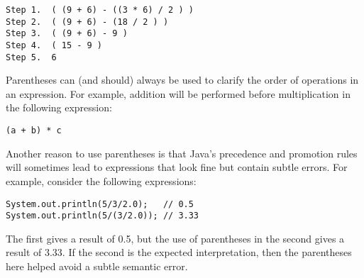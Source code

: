 \begin{jjjlisting}
\begin{lstlisting}
Step 1.  ( (9 + 6) - ((3 * 6) / 2 ) )
Step 2.  ( (9 + 6) - (18 / 2 ) )
Step 3.  ( (9 + 6) - 9 )
Step 4.  ( 15 - 9 )
Step 5.  6
\end{lstlisting}
\end{jjjlisting}


\noindent Parentheses can (and should) always be used to clarify
the order of operations in an expression.  For example, addition will
be performed before multiplication in the following expression:

\begin{jjjlisting}
\begin{lstlisting}
(a + b) * c
\end{lstlisting}
\end{jjjlisting}

\noindent Another reason to use parentheses is that Java's precedence 
and promotion rules will
sometimes lead to expressions that look fine but contain subtle 
errors.  For example, consider the following expressions:

\begin{jjjlisting}
\begin{lstlisting}
System.out.println(5/3/2.0);   // 0.5
System.out.println(5/(3/2.0)); // 3.33
\end{lstlisting}
\end{jjjlisting}

\noindent The first gives a result of 0.5, but the use of parentheses
in the second gives a result of 3.33. If the second is the
expected interpretation, then the parentheses here helped
avoid a subtle semantic error.


\label{self-study-exercise}


